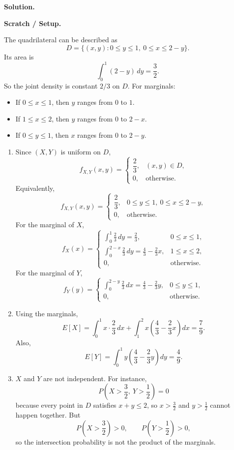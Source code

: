 \documentclass[12pt]{article}
\newenvironment{solution}{%
  \noindent\textbf{Solution.}\ \ignorespaces
}{\par}
\newenvironment{scratch}{%
  \begin{boxnote}\textbf{Scratch / Setup.}\ \small
}{\end{boxnote}}
\begin{document}
\begin{solution}
\begin{scratch}
The quadrilateral can be described as
\[
D=\{(x,y):0\le y\le 1,\ 0\le x\le 2-y\}.
\]
Its area is
\[
\int_0^1 (2-y)\,dy=\frac32.
\]
So the joint density is constant $2/3$ on $D$.
For marginals:
\begin{itemize}
\item If $0\le x\le 1$, then $y$ ranges from $0$ to $1$.
\item If $1\le x\le 2$, then $y$ ranges from $0$ to $2-x$.
\item If $0\le y\le 1$, then $x$ ranges from $0$ to $2-y$.
\end{itemize}
\end{scratch}

\begin{enumerate}[label=(\alph*)]
\item Since $(X,Y)$ is uniform on $D$,
\[
f_{X,Y}(x,y)=
\begin{cases}
\dfrac23, & (x,y)\in D,\\
0, & \text{otherwise.}
\end{cases}
\]
Equivalently,
\[
f_{X,Y}(x,y)=
\begin{cases}
\dfrac23, & 0\le y\le 1,\ 0\le x\le 2-y,\\
0, & \text{otherwise.}
\end{cases}
\]
For the marginal of $X$,
\[
f_X(x)=
\begin{cases}
\int_0^1 \frac23\,dy=\frac23, & 0\le x\le 1,\\[8pt]
\int_0^{2-x}\frac23\,dy=\frac43-\frac23x, & 1\le x\le 2,\\[8pt]
0, & \text{otherwise.}
\end{cases}
\]
For the marginal of $Y$,
\[
f_Y(y)=
\begin{cases}
\int_0^{2-y}\frac23\,dx=\frac43-\frac23y, & 0\le y\le 1,\\[8pt]
0, & \text{otherwise.}
\end{cases}
\]
\item Using the marginals,
\[
E[X]=\int_0^1 x\cdot \frac23\,dx+\int_1^2 x\left(\frac43-\frac23x\right)dx
=\frac{7}{9}.
\]
Also,
\[
E[Y]=\int_0^1 y\left(\frac43-\frac23y\right)dy=\frac49.
\]
\item $X$ and $Y$ are not independent. For instance,
\[
P\!\left(X>\frac32,\ Y>\frac12\right)=0
\]
because every point in $D$ satisfies $x+y\le 2$, so $x>\frac32$ and
$y>\frac12$ cannot happen together. But
\[
P\!\left(X>\frac32\right)>0,\qquad P\!\left(Y>\frac12\right)>0,
\]
so the intersection probability is not the product of the marginals.
\end{enumerate}


\end{solution}
\end{document}
